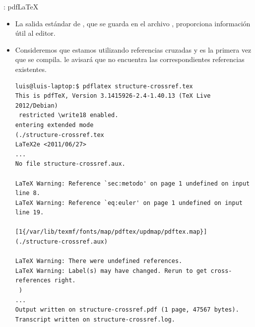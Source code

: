 \documentclass[draft]{beamer}
\begin{document}
\begin{frame}[fragile]{\insertsection: pdf\LaTeX{}}
  \begin{itemize}
  \item La salida estándar de , que se guarda en el
    archivo , proporciona información útil al editor. 
  \item Consideremos que estamos utilizando referencias cruzadas y es
    la primera vez que se compila.  le avisará que no
    encuentra las correspondientes referencias existentes.
    \begin{center}
      \begin{verbatim}
luis@luis-laptop:$ pdflatex structure-crossref.tex 
This is pdfTeX, Version 3.1415926-2.4-1.40.13 (TeX Live 2012/Debian)
 restricted \write18 enabled.
entering extended mode
(./structure-crossref.tex
LaTeX2e <2011/06/27>
...
No file structure-crossref.aux.

LaTeX Warning: Reference `sec:metodo' on page 1 undefined on input line 8.
LaTeX Warning: Reference `eq:euler' on page 1 undefined on input line 19.

[1{/var/lib/texmf/fonts/map/pdftex/updmap/pdftex.map}]
(./structure-crossref.aux)

LaTeX Warning: There were undefined references.
LaTeX Warning: Label(s) may have changed. Rerun to get cross-references right.
 )
...
Output written on structure-crossref.pdf (1 page, 47567 bytes).
Transcript written on structure-crossref.log.
      \end{verbatim}
    \end{center}
  \end{itemize}
\end{frame}
\end{document}
